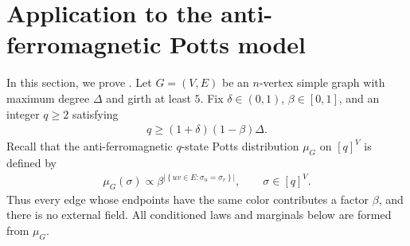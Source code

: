 \documentclass[a4paper,12pt]{article}
\theoremstyle{plain}
\theoremstyle{definition}
\newcommand{\set}[1]{\left\{#1\right\}}
\newcommand{\abs}[1]{\left\vert#1\right\vert}
\begin{document}
\section{Application to the anti-ferromagnetic Potts model}
\label{sec:Potts}
In this section, we prove .
Let $G=(V,E)$ be an $n$-vertex simple graph with maximum degree
$\Delta$ and girth at least $5$.  Fix $\delta\in(0,1)$,
$\beta\in[0,1]$, and an integer $q\geq2$ satisfying
\begin{align*}
  q\geq(1+\delta)(1-\beta)\Delta.
\end{align*}
Recall that the anti-ferromagnetic $q$-state Potts distribution
$\mu_G$ on $[q]^V$ is defined by
\begin{align*}
  \mu_G(\sigma)
  \propto
  \beta^{\abs{\set{uv\in E:\sigma_u=\sigma_v}}},
  \qquad \sigma\in[q]^V.
\end{align*}
Thus every edge whose endpoints have the same color contributes a
factor $\beta$, and there is no external field.  All conditioned laws
and marginals below are formed from $\mu_G$.
\end{document}
